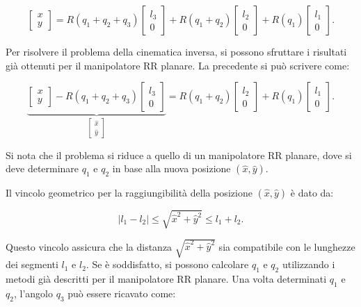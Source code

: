﻿\documentclass[11pt, a4paper]{article}
\begin{document}
\[
    \begin{bmatrix}
    x \\
    y
    \end{bmatrix}
    =
    R(q_1 + q_2 + q_3)
    \begin{bmatrix}
    l_3 \\
    0
    \end{bmatrix}
    +
    R(q_1 + q_2)
    \begin{bmatrix}
    l_2 \\
    0
    \end{bmatrix}
    +
    R(q_1)
    \begin{bmatrix}
    l_1 \\
    0
    \end{bmatrix}.
\]


Per risolvere il problema della cinematica inversa, si possono sfruttare i risultati già ottenuti per il manipolatore RR planare. La precedente si può scrivere come:

\[
\underbrace{
    \begin{bmatrix}
    x \\
    y
    \end{bmatrix}
    -
    R(q_1 + q_2 + q_3)
    \begin{bmatrix}
    l_3 \\
    0
    \end{bmatrix}
    }_{\begin{bmatrix}
    \hat{x} \\
    \hat{y}
    \end{bmatrix}}
    =
    R(q_1 + q_2)
    \begin{bmatrix}
    l_2 \\
    0
    \end{bmatrix}
    +
    R(q_1)
    \begin{bmatrix}
    l_1 \\
    0
    \end{bmatrix}.
\]

Si nota che il problema si riduce a quello di un manipolatore RR planare, dove si deve determinare $ q_1 $ e $ q_2 $ in base alla nuova posizione $ (\hat{x}, \hat{y}) $.

Il vincolo geometrico per la raggiungibilità della posizione $ (\hat{x}, \hat{y}) $ è dato da:

\[
|l_1 - l_2| \leq \sqrt{\hat{x}^2 + \hat{y}^2} \leq l_1 + l_2.
\]

Questo vincolo assicura che la distanza $ \sqrt{\hat{x}^2 + \hat{y}^2} $ sia compatibile con le lunghezze dei segmenti $ l_1 $ e $ l_2 $. Se è soddisfatto, si possono calcolare $ q_1 $ e $ q_2 $ utilizzando i metodi già descritti per il manipolatore RR planare. Una volta determinati $ q_1 $ e $ q_2 $, l'angolo $ q_3 $ può essere ricavato come:
\end{document}
